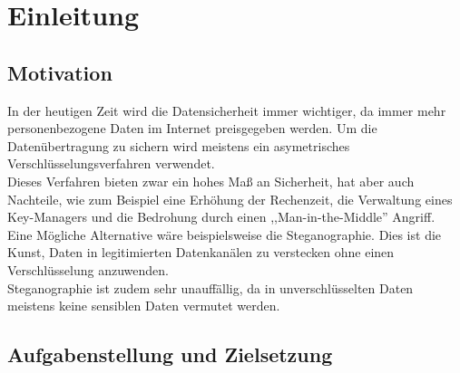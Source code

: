 

\chapter{Einleitung}
\label{cha:einleitung}


\section {Motivation}

In der heutigen Zeit wird die Datensicherheit immer wichtiger, da immer mehr personenbezogene Daten im Internet preisgegeben werden. Um die Daten\"ubertragung zu sichern wird meistens ein asymetrisches Verschl\"usselungsverfahren verwendet.\\
Dieses Verfahren bieten zwar ein hohes Ma{\ss} an Sicherheit, hat aber auch Nachteile, wie zum Beispiel eine Erh\"ohung der Rechenzeit, die Verwaltung eines Key-Managers und die Bedrohung durch einen ,,Man-in-the-Middle'' Angriff.\\ 
Eine M\"ogliche Alternative w\"are beispielsweise die Steganographie. Dies ist die Kunst, Daten in legitimierten Datenkan\"alen zu verstecken ohne einen Verschl\"usselung anzuwenden.\\
Steganographie ist zudem sehr unauff\"allig, da in unverschl\"usselten Daten meistens keine sensiblen Daten vermutet werden.

\section {Aufgabenstellung und Zielsetzung}

